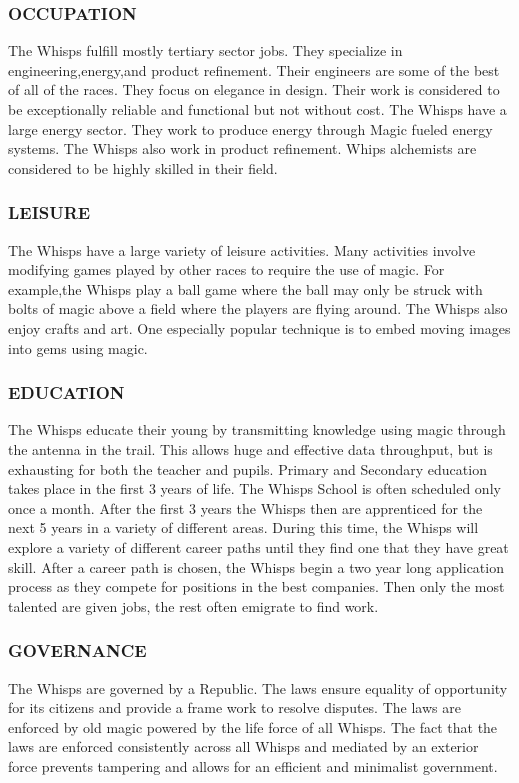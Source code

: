 \subsubsection{OCCUPATION}
The Whisps fulfill mostly tertiary sector jobs.  They specialize in engineering,energy,and product refinement.  Their engineers are some of the best of all of the races.  They focus on elegance in design.  Their work is considered to be exceptionally reliable and functional but not without cost.  The Whisps have a large energy sector.  They work to produce energy through Magic fueled energy systems.  The Whisps also work in product refinement.  Whips alchemists are considered to be highly skilled in their field.  
\subsubsection{LEISURE}
The Whisps have a large variety of leisure activities.  Many activities involve modifying games played by other races to require the use of magic.  For example,the Whisps play a ball game where the ball may only be struck with bolts of magic above a field where the players are flying around.  The Whisps also enjoy crafts and art.  One especially popular technique is to embed moving images into gems using magic.
\subsubsection{EDUCATION}
The Whisps educate their young by transmitting knowledge using magic through the antenna in the trail.  This allows huge and effective data throughput, but is exhausting for both the teacher and pupils.  Primary and Secondary education takes place in the first 3 years of life.  The Whisps School is often scheduled only once a month.  After the first 3 years the Whisps then are apprenticed for the next 5 years in a variety of different areas.  During this time, the Whisps will explore a variety of different career paths until they find one that they have great skill.  After a career path is chosen, the Whisps begin a two year long application process as they compete for positions in the best companies.  Then only the most talented are given jobs, the rest often emigrate to find work.
\subsubsection{GOVERNANCE}
The Whisps are governed by a Republic.  The laws ensure equality of opportunity for its citizens and provide a frame work to resolve disputes.  The laws are enforced by old magic powered by the life force of all Whisps.  The fact that the laws are enforced consistently across all Whisps and mediated by an exterior force prevents tampering and allows for an efficient and minimalist government.
